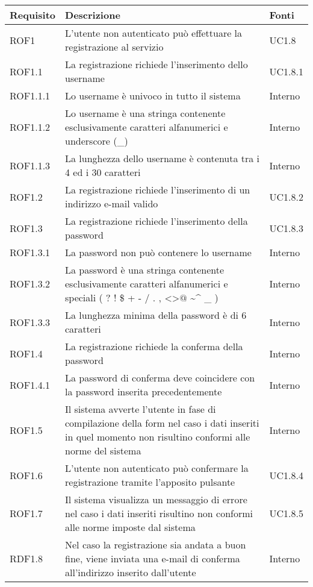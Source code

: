 \begin{center}

	\def\arraystretch{1.5}
	\bgroup
	\begin{longtable}{| p{2.5cm} | p{8cm} | p{2cm} |}

		\hline
		\textbf{Requisito} & \textbf{Descrizione} & \textbf{Fonti} \\
		\hline


		ROF1  &  L'utente non autenticato può effettuare la registrazione al servizio  &  UC1.8 \\
		\hline
		ROF1.1  &  La registrazione richiede l'inserimento dello username  &  UC1.8.1 \\
		\hline
		ROF1.1.1  &  Lo username è univoco in tutto il sistema  &  Interno \\
		\hline
		ROF1.1.2  &  Lo username è una stringa contenente esclusivamente caratteri alfanumerici e underscore (\_)  &  Interno \\
		\hline
		ROF1.1.3  &  La lunghezza dello username è contenuta tra i 4 ed i 30 caratteri  &  Interno \\
		\hline
		ROF1.2  &  La registrazione richiede l'inserimento di un indirizzo e-mail valido &  UC1.8.2 \\
		\hline
		ROF1.3  &  La registrazione richiede l'inserimento della password  &  UC1.8.3 \\
		\hline
		ROF1.3.1  &  La password non può contenere lo username  &  Interno \\
		\hline
		ROF1.3.2  &  La password è una stringa contenente esclusivamente caratteri alfanumerici e speciali ( ? ! \$ + - / . , \textless \textgreater $@$ \textasciitilde \^{} \_ )  &  Interno \\
		\hline
		ROF1.3.3  &  La lunghezza minima della password è di 6 caratteri  &  Interno \\
		\hline
		ROF1.4  &  La registrazione richiede la conferma della password  &  Interno \\
		\hline
		ROF1.4.1  &  La password di conferma deve coincidere con la password inserita precedentemente  &  Interno \\
		\hline
		ROF1.5  &  Il sistema avverte l'utente in fase di compilazione della form nel caso i dati inseriti in quel momento non risultino conformi alle norme del sistema  &  Interno \\
		\hline
		ROF1.6  &  L'utente non autenticato può confermare la registrazione tramite l'apposito pulsante  &  UC1.8.4 \\
		\hline
		ROF1.7  &  Il sistema visualizza un messaggio di errore nel caso i dati inseriti risultino non conformi alle norme imposte dal sistema  &  UC1.8.5 \\
		\hline
		RDF1.8  &  Nel caso la registrazione sia andata a buon fine, viene inviata una e-mail di conferma all'indirizzo inserito dall'utente  &  Interno \\
		\hline


\end{longtable}
\end{center}
